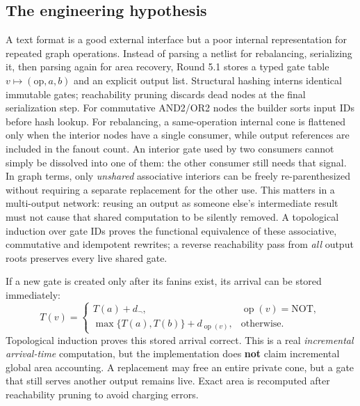 \documentclass[a4paper,10pt]{article}
\theoremstyle{definition}
\theoremstyle{remark}
\begin{document}
\subsection{The engineering hypothesis}
A text format is a good external interface but a poor internal representation for repeated graph operations. Instead of parsing a netlist for rebalancing, serializing it, then parsing again for area recovery, Round 5.1 stores a typed gate table $v\mapsto(\mathrm{op},a,b)$ and an explicit output list. Structural hashing interns identical immutable gates; reachability pruning discards dead nodes at the final serialization step. For commutative AND2/OR2 nodes the builder sorts input IDs before hash lookup. For rebalancing, a same-operation internal cone is flattened only when the interior nodes have a single consumer, while output references are included in the fanout count. An interior gate used by two consumers cannot simply be dissolved into one of them: the other consumer still needs that signal. In graph terms, only \emph{unshared} associative interiors can be freely re-parenthesized without requiring a separate replacement for the other use. This matters in a multi-output network: reusing an output as someone else's intermediate result must not cause that shared computation to be silently removed. A topological induction over gate IDs proves the functional equivalence of these associative, commutative and idempotent rewrites; a reverse reachability pass from \emph{all} output roots preserves every live shared gate.

If a new gate is created only after its fanins exist, its arrival can be stored immediately:
\begin{equation}
 T(v)=\begin{cases}
 T(a)+d_{\neg},&\operatorname{op}(v)=\mathrm{NOT},\\
 \max\{T(a),T(b)\}+d_{\operatorname{op}(v)},&\text{otherwise}.
 \end{cases}
\end{equation}
Topological induction proves this stored arrival correct. This is a real \emph{incremental arrival-time} computation, but the implementation does \textbf{not} claim incremental global area accounting. A replacement may free an entire private cone, but a gate that still serves another output remains live. Exact area is recomputed after reachability pruning to avoid charging errors.
\end{document}
